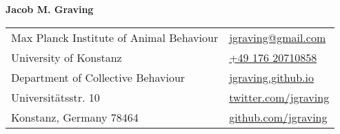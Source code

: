 \documentclass[letterpaper,10pt,oneside]{article}
\begin{document}

\hspace{1mm} \LARGE{\textbf{Jacob M. Graving}}  \\
\normalsize



\begin{center}
\begin{tabular}{l l}
 Max Planck Institute of Animal Behaviour		& \hspace{2in} \href{mailto:jgraving@gmail.com}{\faEnvelope{ } jgraving@gmail.com} \\
 University of Konstanz		& \hspace{2in}   \href{tel:+4917620710858 }{\faPhone{ } +49 176 20710858 }  \\
 Department of Collective Behaviour     & \hspace{2in}  \href{http://jgraving.github.io/}{\faGlobe{ } jgraving.github.io}   \\
 Universit\"{a}tsstr. 10             & \hspace{2in}  \href{https://twitter.com/jgraving}{\faTwitter{ }  twitter.com/jgraving}   \\
 Konstanz, Germany 78464 & \hspace{2in} \href{https://github.com/jgraving}{\faGithub{ }  github.com/jgraving} \\
\end{tabular}
\end{center}

\end{document}
